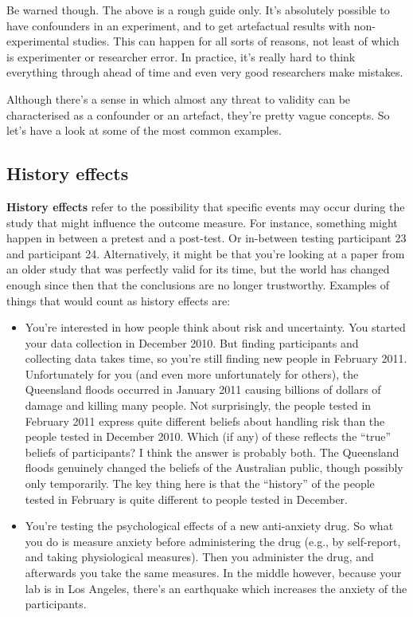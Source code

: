 \documentclass[
]{book}
\begin{document}
Be warned though. The above is a rough guide only. It's absolutely possible to have confounders in an experiment, and to get artefactual results with non-experimental studies. This can happen for all sorts of reasons, not least of which is experimenter or researcher error. In practice, it's really hard to think everything through ahead of time and even very good researchers make mistakes.

Although there's a sense in which almost any threat to validity can be characterised as a confounder or an artefact, they're pretty vague concepts. So let's have a look at some of the most common examples.

\hypertarget{history-effects}{%
\subsection{History effects}\label{history-effects}}

\textbf{History effects} refer to the possibility that specific events may occur during the study that might influence the outcome measure. For instance, something might happen in between a pretest and a post-test. Or in-between testing participant 23 and participant 24. Alternatively, it might be that you're looking at a paper from an older study that was perfectly valid for its time, but the world has changed enough since then that the conclusions are no longer trustworthy. Examples of things that would count as history effects are:

\begin{itemize}
\item
  You're interested in how people think about risk and uncertainty. You started your data collection in December 2010. But finding participants and collecting data takes time, so you're still finding new people in February 2011. Unfortunately for you (and even more unfortunately for others), the Queensland floods occurred in January 2011 causing billions of dollars of damage and killing many people. Not surprisingly, the people tested in February 2011 express quite different beliefs about handling risk than the people tested in December 2010. Which (if any) of these reflects the ``true'' beliefs of participants? I think the answer is probably both. The Queensland floods genuinely changed the beliefs of the Australian public, though possibly only temporarily. The key thing here is that the ``history'' of the people tested in February is quite different to people tested in December.
\item
  You're testing the psychological effects of a new anti-anxiety drug. So what you do is measure anxiety before administering the drug (e.g., by self-report, and taking physiological measures). Then you administer the drug, and afterwards you take the same measures. In the middle however, because your lab is in Los Angeles, there's an earthquake which increases the anxiety of the participants.
\end{itemize}
\end{document}
